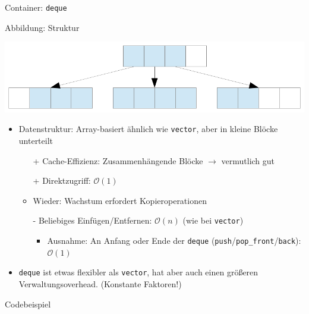 \begin{frame}[fragile]{Container: \texttt{deque}}
	\begin{block}{Abbildung: Struktur}
		\begin{center}
			\includegraphics[width=0.6\linewidth]{images/deque.pdf}
		\end{center}
	\end{block}
	
	\begin{itemize}
		\item Datenstruktur: Array-basiert ähnlich wie \verb|vector|, aber in kleine Blöcke unterteilt
		\pause
		\begin{itemize}
			\item[+] Cache-Effizienz: Zusammenhängende Blöcke $\rightarrow$ vermutlich gut
			\item[+] Direktzugriff: $\mathcal{O}(1)$
			\pause
			\item Wieder: Wachstum erfordert Kopieroperationen
			\item[-] Beliebiges Einfügen/Entfernen: $\mathcal{O}(n)$ (wie bei \verb|vector|)
			\begin{itemize}
				\item Ausnahme: An Anfang oder Ende der \verb|deque| (\verb|push|/\verb|pop_front|/\verb|back|): $\mathcal{O}(1)$
			\end{itemize}
		\end{itemize}
		\pause
		\item \verb|deque| ist etwas flexibler als \verb|vector|, hat aber auch einen größeren Verwaltungsoverhead. (Konstante Faktoren!)
	\end{itemize}
\end{frame}

\begin{frame}{Codebeispiel}
	
\end{frame}

